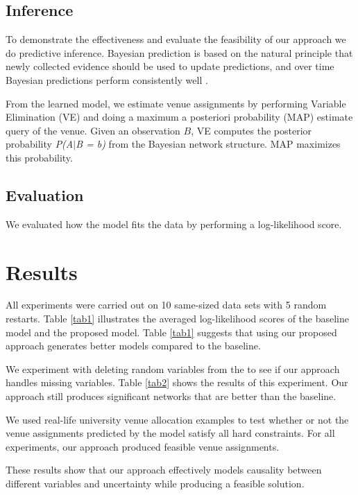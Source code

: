 \documentclass[conference]{IEEEtran}
\begin{document}
\subsection{Inference}
To demonstrate the effectiveness and evaluate the feasibility of our approach we do predictive inference. Bayesian prediction is based on the natural principle that newly collected evidence should be used to update predictions, and over time Bayesian predictions perform consistently well \cite{Sancetta}.

From the learned model, we estimate venue assignments by performing Variable Elimination (VE) and doing a maximum a posteriori probability (MAP) estimate query of the venue. 
Given an observation $B$, VE computes the posterior probability \textit{P(A$\vert$B = b)} from the Bayesian network structure. MAP maximizes this probability.

\subsection{Evaluation}
We evaluated how the model fits the data by performing a log-likelihood score. 
\section{Results}
All experiments were carried out on 10 same-sized data sets with 5 random restarts.
Table \ref{tab1} illustrates the averaged log-likelihood scores of the baseline model and the proposed model. Table \ref{tab1} suggests that using our proposed approach generates better models compared to the baseline.

We experiment with deleting random variables from the to see if our approach handles missing variables. Table \ref{tab2} shows the results of this experiment. Our approach still produces significant networks that are better than the baseline.

We used real-life university venue allocation examples to test whether or not the venue assignments predicted by the model satisfy all hard constraints. For all experiments, our approach produced feasible venue assignments.

These results show that our approach effectively models causality between different variables and uncertainty while producing a feasible solution.
\end{document}
